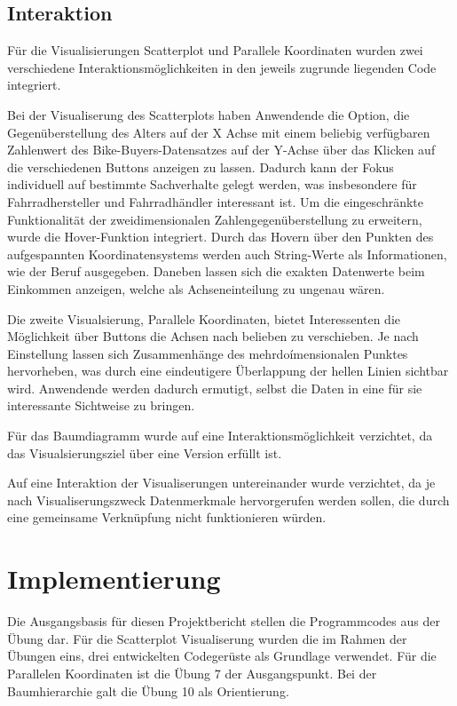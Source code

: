 \documentclass[usegeometry=true]{scrartcl}
\begin{document}
\subsection{Interaktion}
Für die Visualisierungen Scatterplot und Parallele Koordinaten wurden zwei verschiedene Interaktionsmöglichkeiten in den jeweils zugrunde liegenden Code integriert. 

Bei der Visualiserung des Scatterplots haben Anwendende die Option, die Gegenüberstellung des Alters auf der X Achse mit einem beliebig verfügbaren Zahlenwert des Bike-Buyers-Datensatzes auf der Y-Achse  über das Klicken auf die verschiedenen Buttons anzeigen zu lassen. Dadurch kann der Fokus individuell auf bestimmte Sachverhalte gelegt werden, was insbesondere für Fahrradhersteller und Fahrradhändler interessant ist. Um die eingeschränkte Funktionalität der zweidimensionalen Zahlengegenüberstellung zu erweitern, wurde die Hover-Funktion integriert. Durch das Hovern über den Punkten des aufgespannten Koordinatensystems werden auch String-Werte als Informationen, wie der Beruf ausgegeben. Daneben lassen sich die exakten Datenwerte beim Einkommen anzeigen, welche als Achseneinteilung zu ungenau wären. 

Die zweite Visualsierung, Parallele Koordinaten, bietet Interessenten die Möglichkeit über Buttons die Achsen nach belieben zu verschieben. Je nach Einstellung lassen sich Zusammenhänge des mehrdoímensionalen Punktes hervorheben, was durch eine eindeutigere Überlappung der hellen Linien sichtbar wird. Anwendende werden dadurch ermutigt, selbst die Daten in eine für sie interessante Sichtweise zu bringen. 

Für das Baumdiagramm wurde auf eine Interaktionsmöglichkeit verzichtet, da das Visualsierungsziel über eine Version erfüllt ist. 

Auf eine Interaktion der Visualiserungen untereinander wurde verzichtet, da je nach Visualiserungszweck Datenmerkmale hervorgerufen werden sollen, die durch eine gemeinsame Verknüpfung nicht funktionieren würden. 

\section{Implementierung}
Die Ausgangsbasis für diesen Projektbericht stellen die Programmcodes aus der Übung dar. Für die Scatterplot Visualiserung wurden die im Rahmen der Übungen eins, drei entwickelten Codegerüste als Grundlage verwendet. Für die Parallelen Koordinaten ist die Übung 7 der Ausgangspunkt. Bei der Baumhierarchie galt die Übung 10 als Orientierung. 
\end{document}
